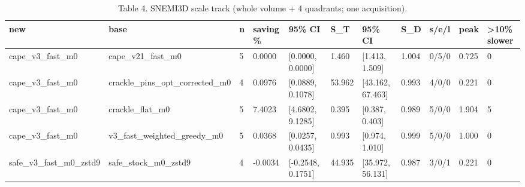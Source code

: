 \begin{table}[t]
\centering
\small
\caption{Table 4. SNEMI3D scale track (whole volume + 4 quadrants; one acquisition).}
\begin{tabular}{lllllllllll}
\hline
new & base & n & saving \% & 95\% CI & S\_T & 95\% CI & S\_D & s/e/l & peak & >10\% slower \\
\hline
cape\_v3\_fast\_m0 & cape\_v21\_fast\_m0 & 5 & 0.0000 & [0.0000, 0.0000] & 1.460 & [1.413, 1.509] & 1.004 & 0/5/0 & 0.725 & 0 \\
cape\_v3\_fast\_m0 & crackle\_pins\_opt\_corrected\_m0 & 4 & 0.0976 & [0.0889, 0.1078] & 53.962 & [43.162, 67.463] & 0.993 & 4/0/0 & 0.221 & 0 \\
cape\_v3\_fast\_m0 & crackle\_flat\_m0 & 5 & 7.4023 & [4.6802, 9.1285] & 0.395 & [0.387, 0.403] & 0.989 & 5/0/0 & 1.904 & 5 \\
cape\_v3\_fast\_m0 & v3\_fast\_weighted\_greedy\_m0 & 5 & 0.0368 & [0.0257, 0.0435] & 0.993 & [0.974, 1.010] & 0.999 & 5/0/0 & 1.000 & 0 \\
safe\_v3\_fast\_m0\_zstd9 & safe\_stock\_m0\_zstd9 & 4 & -0.0034 & [-0.2548, 0.1751] & 44.935 & [35.972, 56.131] & 0.987 & 3/0/1 & 0.221 & 0 \\
\hline
\end{tabular}
\end{table}
